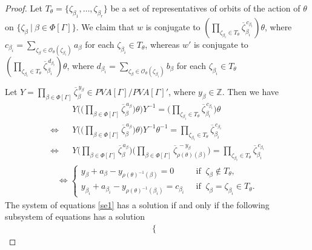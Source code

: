 \documentclass[10pt,a4paper]{amsart}
\begin{document}
\begin{proof}
Let $T_\theta=\{\zeta_{\beta_1}, \ldots, \zeta_{\beta_r}\}$ be a set of representatives of orbits of the action of $\theta$ on $\{\zeta_\beta ~|~ \beta \in \Phi[\Gamma]\}$. We claim that $w$ is conjugate to  $(\prod_{\zeta_{\beta_i}\in T_{\theta}} \overline{\zeta}_{\beta_i}^{\,c_{\beta_i}})\theta$, where $c_{\beta_i}=\sum_{\zeta_\beta\in\mathcal{O}_{\theta}(\zeta_{\beta_i})}{a_\beta}$ for each $\zeta_{\beta_i}\in T_{\theta}$, whereas $w'$ is conjugate to $(\prod_{\zeta_{\beta_i}\in T_{\theta}} \overline{\zeta}_{\beta_i}^{\,d_{\beta_i}})\theta$, where $d_{\beta_i}=\sum_{\zeta_\beta\in\mathcal{O}_{\theta}(\zeta_{\beta_i})}{b_\beta}$ for each $\zeta_{\beta_i}\in T_{\theta}$
\par

Let $Y=\prod_{\beta \in \Phi[\Gamma]}\overline{\zeta}_{\beta}^{\, y_\beta}\in PVA[\Gamma]/PVA[\Gamma]'$, where $y_\beta\in\mathbb Z$. Then we have
\begin{eqnarray*}
& &Y \Bigg(\big(\prod_{\beta \in \Phi[\Gamma]}\overline{\zeta}_{\beta}^{\,a_\beta} \big)\theta \Bigg)Y^{-1}=\big(\prod_{\zeta_{\beta_i}\in T_{\theta}} \overline{\zeta}_{\beta_i}^{\,c_{\beta_i}} \big)\theta\\
\Leftrightarrow & & Y \Bigg( \big(\prod_{\beta \in \Phi[\Gamma]} \overline{\zeta}_{\beta}^{\,a_\beta} \big)\theta  \Bigg)Y^{-1} \theta^{-1}=\prod_{\zeta_{\beta_i}\in T_{\theta}} \overline{\zeta}_{\beta_i}^{\,c_{\beta_i}}\\
\Leftrightarrow & & Y \Bigg(\prod_{\beta \in \Phi[\Gamma]} \overline{\zeta}_{\beta}^{\,a_\beta}\Bigg)  \Bigg(\prod_{\beta \in \Phi[\Gamma]}\overline{\zeta}_{{\rho(\theta)(\beta)}}^{\,-y_\beta} \Bigg)=\prod_{\zeta_{\beta_i}\in T_{\theta}}\overline{\zeta}_{\beta_i}^{\,c_{\beta_i}}
\end{eqnarray*}
\begin{align}\label{se1}
\Leftrightarrow\begin{cases}
	y_{\beta}+a_{\beta}- y_{\rho(\theta)^{-1}(\beta)}=0 &~\mbox{ if }~\zeta_\beta\notin T_{\theta},\\
	y_{\beta_i}+a_{\beta_i}-y_{\rho(\theta)^{-1}(\beta_i)}=c_{\beta_i} &~\mbox{ if }~\zeta_\beta=\zeta_{\beta_i}\in T_{\theta}.
\end{cases}
\end{align}
The system of equations \eqref{se1} has a solution if and only if the following subsystem of equations has a solution   
	\begin{align}\label{se2}
\begin{cases}

\end{cases}
\end{align}
\end{proof}
\end{document}
